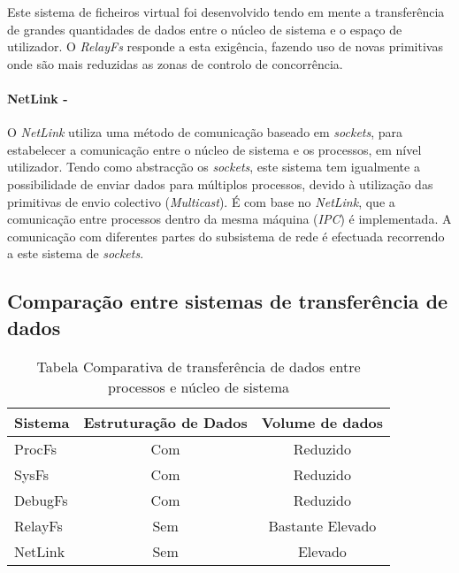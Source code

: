 Este sistema de ficheiros virtual foi desenvolvido tendo em mente a transferência de grandes quantidades de dados entre o núcleo de sistema e o espaço de utilizador.
O \textit{RelayFs} responde a esta exigência, fazendo uso de novas primitivas onde são mais reduzidas as zonas de controlo de concorrência\cite{Donovan2007,To03relayfs:an}.

\paragraph*{NetLink - }\label{cap:NetLink_overview}
O \textit{NetLink} utiliza uma método de comunicação baseado em \textit{sockets}, para estabelecer a comunicação entre o núcleo de sistema e os processos, em nível utilizador. 
 Tendo como abstracção os \textit{sockets}, este sistema tem igualmente a possibilidade de enviar dados para múltiplos processos, devido à utilização das primitivas de envio colectivo (\textit{Multicast}).
 É com base no \textit{NetLink}, que a comunicação entre processos dentro da mesma máquina (\textit{IPC}) é implementada.
 A comunicação com diferentes partes do subsistema de rede é efectuada recorrendo a este sistema de \textit{sockets}.


\subsection{Comparação entre sistemas de transferência de dados}
\begin{table}[h]
\begin{center}

\begin{tabular}{|l||c|c|}
\hline
Sistema & Estruturação de Dados & Volume de dados \\
\hline
ProcFs & Com & Reduzido \\
\hline
SysFs & Com & Reduzido \\
\hline
DebugFs & Com & Reduzido \\
\hline
RelayFs & Sem & Bastante Elevado \\
\hline
NetLink & Sem & Elevado \\
\hline
\end{tabular}
\caption{Tabela Comparativa de transferência de dados entre processos e núcleo de sistema}
\label{tab:transf_compare}
\end{center}
\end{table}

